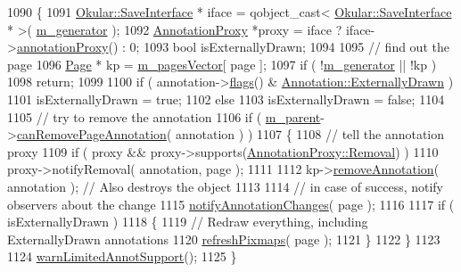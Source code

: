 \begin{DoxyCode}
1090 \{
1091     \hyperlink{classOkular_1_1SaveInterface}{Okular::SaveInterface} * iface = qobject\_cast< 
      \hyperlink{classOkular_1_1SaveInterface}{Okular::SaveInterface} * >( \hyperlink{classOkular_1_1DocumentPrivate_a52083f79ce95756ddea060e74315e91f}{m\_generator} );
1092     \hyperlink{classOkular_1_1AnnotationProxy}{AnnotationProxy} *proxy = iface ? iface->\hyperlink{classOkular_1_1SaveInterface_a1fdb82695d9758e9e68ab0129bf16237}{annotationProxy}() : 0;
1093     \textcolor{keywordtype}{bool} isExternallyDrawn;
1094 
1095     \textcolor{comment}{// find out the page}
1096     \hyperlink{classOkular_1_1Page}{Page} * kp = \hyperlink{classOkular_1_1DocumentPrivate_a73b852d9a73ffe8061b66dbf9b290f17}{m\_pagesVector}[ page ];
1097     \textcolor{keywordflow}{if} ( !\hyperlink{classOkular_1_1DocumentPrivate_a52083f79ce95756ddea060e74315e91f}{m\_generator} || !kp )
1098         \textcolor{keywordflow}{return};
1099 
1100     \textcolor{keywordflow}{if} ( annotation->\hyperlink{classOkular_1_1Annotation_a3d6f7ee5057155b90e76c24768880947}{flags}() & \hyperlink{classOkular_1_1Annotation_a8a214541446745761efeda70b3a4302ea75f088f5533ace9d9d47a506b707f5a1}{Annotation::ExternallyDrawn} )
1101         isExternallyDrawn = \textcolor{keyword}{true};
1102     \textcolor{keywordflow}{else}
1103         isExternallyDrawn = \textcolor{keyword}{false};
1104 
1105     \textcolor{comment}{// try to remove the annotation}
1106     \textcolor{keywordflow}{if} ( \hyperlink{classOkular_1_1DocumentPrivate_ac921eda41c014869ffec96ecc569c713}{m\_parent}->\hyperlink{classOkular_1_1Document_a77f5c38224da847413dbe51c5e24ed08}{canRemovePageAnnotation}( annotation ) )
1107     \{
1108         \textcolor{comment}{// tell the annotation proxy}
1109         \textcolor{keywordflow}{if} ( proxy && proxy->supports(\hyperlink{classOkular_1_1AnnotationProxy_ae89e16435aa7e10ac4089e673f44e543ace001445896cb9742c5282e4fa127936}{AnnotationProxy::Removal}) )
1110             proxy->notifyRemoval( annotation, page );
1111 
1112         kp->\hyperlink{classOkular_1_1Page_a4f0217cfbc8986acb9bb398550cd5bc7}{removeAnnotation}( annotation ); \textcolor{comment}{// Also destroys the object}
1113 
1114         \textcolor{comment}{// in case of success, notify observers about the change}
1115         \hyperlink{classOkular_1_1DocumentPrivate_a1ca2b2788a81ae1bf852d5eab1de541c}{notifyAnnotationChanges}( page );
1116 
1117         \textcolor{keywordflow}{if} ( isExternallyDrawn )
1118         \{
1119             \textcolor{comment}{// Redraw everything, including ExternallyDrawn annotations}
1120             \hyperlink{classOkular_1_1DocumentPrivate_a2de4027c4556e563bb24d465aa6ce5a6}{refreshPixmaps}( page );
1121         \}
1122     \}
1123 
1124     \hyperlink{classOkular_1_1DocumentPrivate_abfb2abf66a3eb0536063c818a8e793e9}{warnLimitedAnnotSupport}();
1125 \}
\end{DoxyCode}
